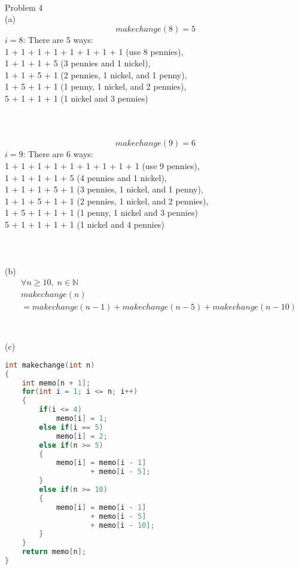 \documentclass[12pt,border=4pt,multi]{article}%
\begin{document}
\\
\\
\\
Problem 4\\
(a)
\[makechange(8) = 5\]
$i = 8$: There are 5 ways:\\
1 + 1 + 1 + 1 + 1 + 1 + 1 + 1 (use 8 pennies),\\
1 + 1 + 1 + 5 (3 pennies and 1 nickel),\\
1 + 1 + 5 + 1 (2 pennies, 1 nickel, and 1 penny),\\
1 + 5 + 1 + 1 (1 penny, 1 nickel, and 2 pennies),\\
5 + 1 + 1 + 1 (1 nickel and 3 pennies)\\
\\
\\
\\
\[makechange(9) = 6\]
$i = 9$: There are 6 ways:\\
1 + 1 + 1 + 1 + 1 + 1 + 1 + 1 + 1 (use 9 pennies),\\
1 + 1 + 1 + 1 + 5 (4 pennies and 1 nickel),\\
1 + 1 + 1 + 5 + 1 (3 pennies, 1 nickel, and 1 penny),\\
1 + 1 + 5 + 1 + 1 (2 pennies, 1 nickel, and 2 pennies),\\
1 + 5 + 1 + 1 + 1 (1 penny, 1 nickel and 3 pennies)\\
5 + 1 + 1 + 1 + 1 (1 nickel and 4 pennies)\\
\\
\\
\\
(b)
\begin{align*}
&\forall n \geq 10,\; n \in \mathbb{N}\\
&makechange(n)\\
&= makechange(n - 1) + makechange(n - 5) + makechange(n - 10)\\ 
\end{align*}
\\
\\
\newpage
\noindent
(c)
\begin{lstlisting}[language = c]
int makechange(int n)
{
    int memo[n + 1];
    for(int i = 1; i <= n; i++)
    {
        if(i <= 4)
            memo[i] = 1;
        else if(i == 5)
            memo[i] = 2;
        else if(n >= 5)
        {
            memo[i] = memo[i - 1] 
                    + memo[i - 5];
        }
        else if(n >= 10)
        {
            memo[i] = memo[i - 1] 
                    + memo[i - 5] 
                    + memo[i - 10];
        }
    }
    return memo[n];
}
\end{lstlisting}
\end{document}
